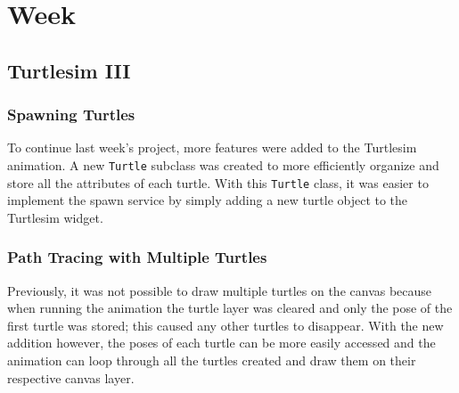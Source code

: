 \chapter{Week} %

\section{Turtlesim III}

    \subsection{Spawning Turtles}
        
        To continue last week's project, more features were added to the Turtlesim animation. A new \texttt{Turtle} subclass was created to more efficiently organize and store all the attributes of each turtle. With this \texttt{Turtle} class, it was easier to implement the spawn service by simply adding a new turtle object to the Turtlesim widget. 
        
    \subsection{Path Tracing with Multiple Turtles}
        
        Previously, it was not possible to draw multiple turtles on the canvas because when running the animation the turtle layer was cleared and only the pose of the first turtle was stored; this caused any other turtles to disappear. With the new addition however, the poses of each turtle can be more easily accessed and the animation can loop through all the turtles created and draw them on their respective canvas layer. 

